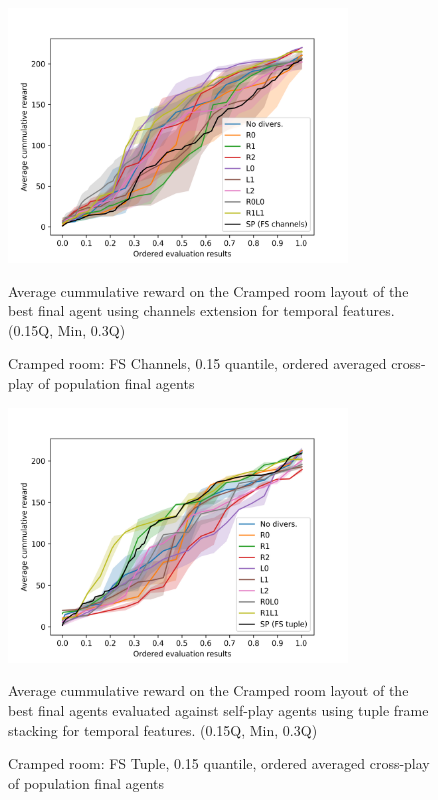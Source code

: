 \begin{figure}[!ht]
    \centering
    \includegraphics*[width=9cm]{../img/CrampedRoomFSChannelsOrdered15Q.png}

    \caption{Cramped room: FS Channels, 0.15 quantile, ordered averaged cross-play of population final agents}
    \label{CrampedRoomFSChannelsOrdered15Q}
    \medskip
    \small 
    Average cummulative reward on the Cramped room layout of the best final agent using channels extension for temporal features.    
    (0.15Q, Min, 0.3Q)

\end{figure}

\begin{figure}[!ht]
    \centering
    \includegraphics*[width=9cm]{../img/CrampedRoomFSTupleOrdered15Q.png}

    \caption{Cramped room: FS Tuple, 0.15 quantile, ordered averaged cross-play of population final agents}
    \label{CrampedRoomFSTupleOrdered15Q}
    \medskip
    \small 
    Average cummulative reward on the Cramped room layout of the best final agents evaluated against self-play agents using tuple frame stacking for temporal features.
    (0.15Q, Min, 0.3Q)

\end{figure}

